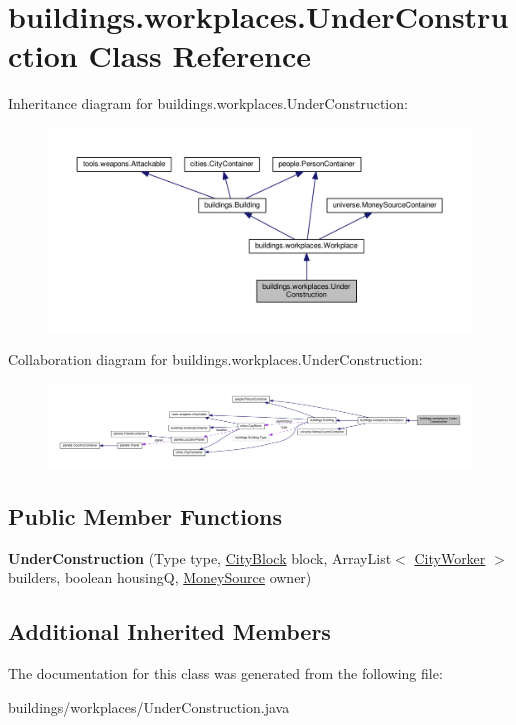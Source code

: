 \hypertarget{classbuildings_1_1workplaces_1_1_under_construction}{}\section{buildings.\+workplaces.\+Under\+Construction Class Reference}
\label{classbuildings_1_1workplaces_1_1_under_construction}


Inheritance diagram for buildings.\+workplaces.\+Under\+Construction\+:\nopagebreak
\begin{figure}[H]
\begin{center}
\leavevmode
\includegraphics[width=350pt]{classbuildings_1_1workplaces_1_1_under_construction__inherit__graph}
\end{center}
\end{figure}


Collaboration diagram for buildings.\+workplaces.\+Under\+Construction\+:\nopagebreak
\begin{figure}[H]
\begin{center}
\leavevmode
\includegraphics[width=350pt]{classbuildings_1_1workplaces_1_1_under_construction__coll__graph}
\end{center}
\end{figure}
\subsection*{Public Member Functions}
\begin{DoxyCompactItemize}
\item 
{\bfseries Under\+Construction} (Type type, \hyperlink{classcities_1_1_city_block}{City\+Block} block, Array\+List$<$ \hyperlink{classpeople_1_1cityworkers_1_1_city_worker}{City\+Worker} $>$ builders, boolean housingQ, \hyperlink{classuniverse_1_1_money_source}{Money\+Source} owner)\hypertarget{classbuildings_1_1workplaces_1_1_under_construction_a31cb91c97acc9882309025edef594eb0}{}\label{classbuildings_1_1workplaces_1_1_under_construction_a31cb91c97acc9882309025edef594eb0}

\end{DoxyCompactItemize}
\subsection*{Additional Inherited Members}


The documentation for this class was generated from the following file\+:\begin{DoxyCompactItemize}
\item 
buildings/workplaces/Under\+Construction.\+java\end{DoxyCompactItemize}
